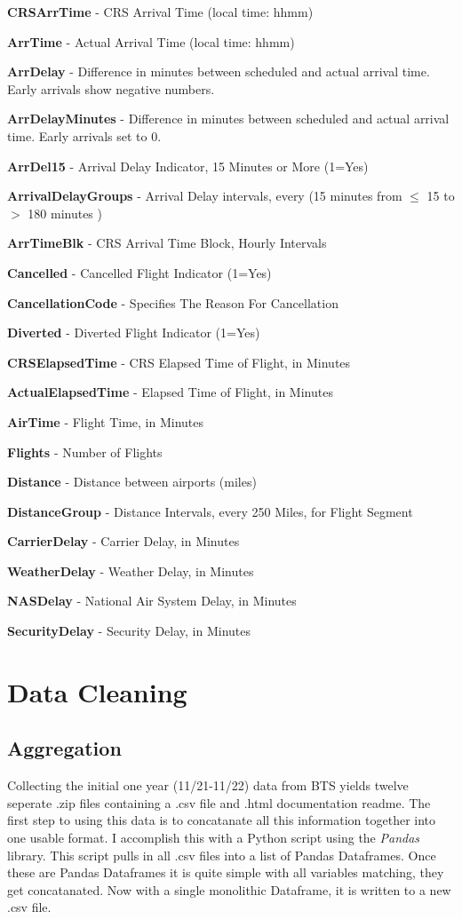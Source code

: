 \documentclass[a4paper,11pt]{article}
\begin{document}
\textbf{CRSArrTime} - CRS Arrival Time (local time: hhmm)

\textbf{ArrTime} - Actual Arrival Time (local time: hhmm)

\textbf{ArrDelay} - Difference in minutes between scheduled and actual arrival time. Early arrivals show negative numbers.

\textbf{ArrDelayMinutes} - Difference in minutes between scheduled and actual arrival time. Early arrivals set to 0.

\textbf{ArrDel15} - Arrival Delay Indicator, 15 Minutes or More (1=Yes)

\textbf{ArrivalDelayGroups} - Arrival Delay intervals, every (15 minutes from $\leq$ 15 to $>$ 180 minutes )

\textbf{ArrTimeBlk} - CRS Arrival Time Block, Hourly Intervals

\textbf{Cancelled} - Cancelled Flight Indicator (1=Yes)

\textbf{CancellationCode} - Specifies The Reason For Cancellation

\textbf{Diverted} - Diverted Flight Indicator (1=Yes)

\textbf{CRSElapsedTime} - CRS Elapsed Time of Flight, in Minutes

\textbf{ActualElapsedTime} - Elapsed Time of Flight, in Minutes

\textbf{AirTime} - Flight Time, in Minutes

\textbf{Flights} - Number of Flights

\textbf{Distance} - Distance between airports (miles)

\textbf{DistanceGroup} - Distance Intervals, every 250 Miles, for Flight Segment

\textbf{CarrierDelay} - Carrier Delay, in Minutes

\textbf{WeatherDelay} - Weather Delay, in Minutes

\textbf{NASDelay} - National Air System Delay, in Minutes

\textbf{SecurityDelay} - Security Delay, in Minutes

\section{Data Cleaning}

\subsection{Aggregation}
Collecting the initial one year (11/21-11/22) data from BTS yields twelve seperate .zip files containing a .csv file and .html documentation readme.
The first step to using this data is to concatanate all this information together into one usable format.
I accomplish this with a Python script using the \emph{Pandas} library. This script pulls in all .csv files into a list of Pandas Dataframes.
Once these are Pandas Dataframes it is quite simple with all variables matching, they get concatanated. 
Now with a single monolithic Dataframe, it is written to a new .csv file.
\end{document}
